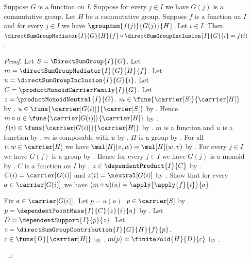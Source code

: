 \begin{theorem}\label{direct_sum_group_mediator_factorization}
    Suppose $G$ is a function on $I$.
    Suppose for every $j\in I$ we have $G(j)$ is a commutative group.
    Let $H$ be a commutative group.
    Suppose $f$ is a function on $I$ and
        for every $j\in I$ we have $\groupHom{f(j)}{G(j)}{H}$.
    Let $i\in I$.
    Then
        $\directSumGroupMediator{I}{G}{H}{f}\circ
            \directSumGroupInclusion{I}{G}{i}=f(i)$.
\end{theorem}
\begin{proof}
    Let $S=\DirectSumGroup{I}{G}$.
    Let $m=\directSumGroupMediator{I}{G}{H}{f}$.
    Let $u=\directSumGroupInclusion{I}{G}{i}$.
    Let $C=\productMonoidCarrierFamily{I}{G}$.
    Let $z=\productMonoidNeutral{I}{G}$.
    $m\in\funs{\carrier[S]}{\carrier[H]}$ by
        .
    $u\in\funs{\carrier[G(i)]}{\carrier[S]}$ by
        .
    Hence $m\circ u\in\funs{\carrier[G(i)]}{\carrier[H]}$ by
        .
    $f(i)\in\funs{\carrier[G(i)]}{\carrier[H]}$ by
        .
    $m$ is a function and $u$ is a function by
        .
    $m$ is composable with $u$ by .
    $H$ is a group by .
    For all $v,w\in\carrier[H]$ we have
        $\mul[H](v,w)=\mul[H](w,v)$ by
        .
    For every $j\in I$ we have $G(j)$ is a group by
        .
    Hence for every $j\in I$ we have $G(j)$ is a monoid by
        .
    $C$ is a function on $I$ by
        .
    $z\in\dependentProduct{I}{C}$ by
        .
    $C(i)=\carrier[G(i)]$ and $z(i)=\neutral[G(i)]$ by
        .
    Show that for every $a\in\carrier[G(i)]$ we have
        $(m\circ u)(a)=\apply{\apply{f}{i}}{a}$.
    \begin{subproof}
        Fix $a\in\carrier[G(i)]$.
        Let $p=u(a)$.
        $p\in\carrier[S]$ by .
        $p=\dependentPointMass{I}{C}{z}{i}{a}$ by
            .
        Let $D=\dependentSupport{I}{p}{z}$.
        Let $c=\directSumGroupContribution{I}{G}{H}{f}{p}$.
        $c\in\funs{D}{\carrier[H]}$ by
            .
        $m(p)=\finiteFold{H}{D}{c}$ by
            .

\end{subproof}
\end{proof}
